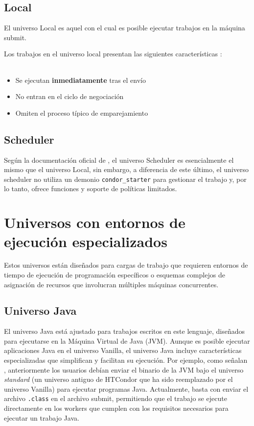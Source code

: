 \subsection{Local}

El universo Local es aquel con el cual es posible ejecutar trabajos en la máquina submit.

Los trabajos en el universo local presentan las siguientes características \citep{HTCondor-choosing-universe}:
\\\\
\begin{itemize}
	\item Se ejecutan \textbf{inmediatamente} tras el envío
	\item No entran en el ciclo de negociación
	\item Omiten el proceso típico de emparejamiento
\end{itemize}


\subsection{Scheduler}

Según la documentación oficial de \cite{HTCondor-choosing-universe}, el universo Scheduler es esencialmente el mismo que el universo Local, sin embargo, a diferencia de este último, el universo scheduler no utiliza un demonio \texttt{condor\_starter} para gestionar el trabajo y, por lo tanto, ofrece funciones y soporte de políticas limitados.

\section{Universos con entornos de ejecución especializados}

Estos universos están diseñados para cargas de trabajo que requieren entornos de tiempo de ejecución de programación específicos o esquemas complejos de asignación de recursos que involucran múltiples máquinas concurrentes.

\subsection{Universo Java}

El universo Java está ajustado para trabajos escritos en este lenguaje, diseñados para ejecutarse en la Máquina Virtual de Java (JVM). Aunque es posible ejecutar aplicaciones Java en el universo Vanilla, el universo Java incluye características especializadas que simplifican y facilitan su ejecución. Por ejemplo, como señalan \cite{Thain2002}, anteriormente los usuarios debían enviar el binario de la JVM bajo el universo \textit{standard} (un universo antiguo de HTCondor que ha sido reemplazado por el universo Vanilla) para ejecutar programas Java. Actualmente, basta con enviar el archivo \texttt{.class} en el archivo submit, permitiendo que el trabajo se ejecute directamente en los workers que cumplen con los requisitos necesarios para ejecutar un trabajo Java.


